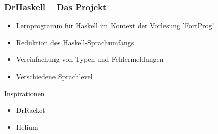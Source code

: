 \begin{frame}
	\frametitle{DrHaskell -- Das Projekt}
	\begin{itemize}
		\item Lernprogramm für Haskell im Kontext der Vorlesung 'FortProg' \pause
		\item Reduktion des Haskell-Sprachumfangs \pause
		\item Vereinfachung von Typen und Fehlermeldungen \pause
		\item Verschiedene Sprachlevel \pause
	\end{itemize}
	\vspace{1em}\pause
	Inspirationen \pause
	\begin{itemize}
		\item DrRacket \pause
		\item Helium
	\end{itemize}
\end{frame}